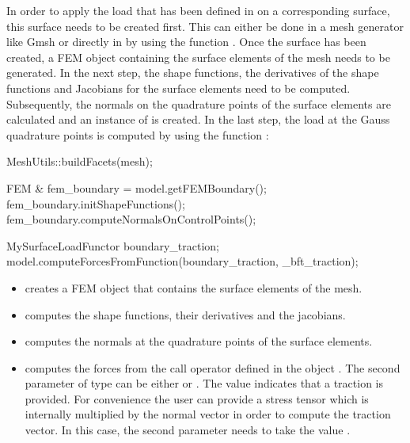 In order to apply the  load that has been defined in 
on a  corresponding surface, this  surface needs to  be created first.  This can
either be done in a mesh generator like Gmsh or directly in \akantu by using the
function . Once the surface has been created,
a  FEM  object  containing  the  surface  elements  of  the  mesh  needs  to  be
generated. In the  next step, the shape functions, the  derivatives of the shape
functions   and    Jacobians   for   the    surface   elements   need    to   be
computed.  Subsequently, the  normals on  the quadrature  points of  the surface
elements  are  calculated  and  an instance  of    is
created. In the  last step, the load at the Gauss  quadrature points is computed
by using the function :
\begin{cpp}
  MeshUtils::buildFacets(mesh);

  FEM & fem_boundary = model.getFEMBoundary();
  fem_boundary.initShapeFunctions();
  fem_boundary.computeNormalsOnControlPoints();

  MySurfaceLoadFunctor boundary_traction;
  model.computeForcesFromFunction(boundary_traction, _bft_traction);
\end{cpp}
\begin{itemize}
\item{}  creates  a  FEM  object  that  contains  the
  surface elements of the mesh.
\item{}  computes  the  shape  functions,
  their derivatives and the jacobians.
\item{}  computes  the normals
  at the quadrature points of the surface elements.
\item{}
  computes  the   forces  from   the  call  operator   defined  in   the  object
  .       The     second     parameter      of     type
     can    be   either      or
  .  The  value     indicates  that  a
  traction is  provided.  For convenience the  user can provide  a stress tensor
  which is  internally multiplied by the  normal vector in order  to compute the
  traction vector.  In  this case, the second parameter needs  to take the value
  .
\end{itemize}

